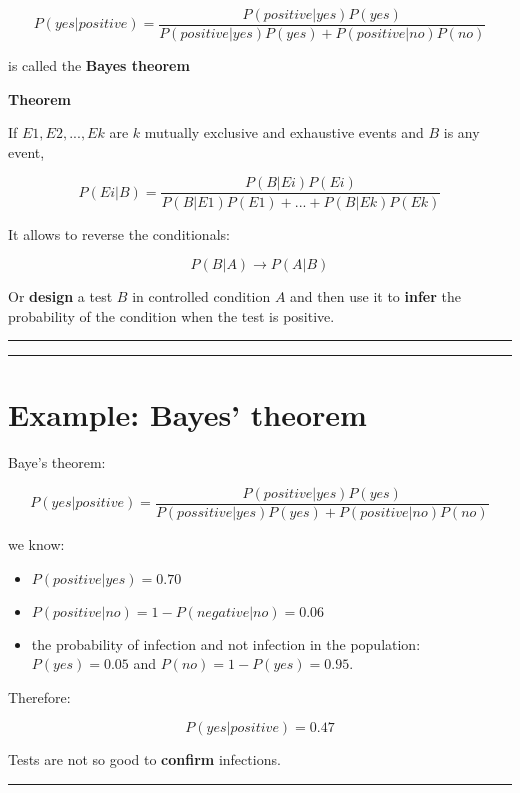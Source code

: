 \documentclass[
]{book}
\begin{document}
\[P(yes|positive)=\frac{P(positive|yes)P(yes)}{P(positive|yes)P(yes)+P(positive|no)P(no)}\]

is called the \textbf{Bayes theorem}

\textbf{Theorem}

If \(E1, E2, ..., Ek\) are \(k\) mutually exclusive and exhaustive events and \(B\) is any event,

\[P(Ei|B)=\frac{P(B|Ei)P(Ei)}{P(B|E1)P(E1) +...+ P(B|Ek)P(Ek)}\]

It allows to reverse the conditionals:

\[P(B|A) \rightarrow P(A|B)\]

Or \textbf{design} a test \(B\) in controlled condition \(A\) and then use it to \textbf{infer} the probability of the condition when the test is positive.

\begin{center}\rule{0.5\linewidth}{0.5pt}\end{center}

\begin{center}\rule{0.5\linewidth}{0.5pt}\end{center}

\hypertarget{example-bayes-theorem}{%
\section{Example: Bayes' theorem}\label{example-bayes-theorem}}

Baye's theorem:

\[P(yes|positive)  = \frac{P(positive|yes) P(yes)}{P(possitive|yes)P(yes)+P(positive|no)P(no)}\]

we know:

\begin{itemize}
\item
  \(P(positive|yes)=0.70\)
\item
  \(P(positive|no)=1- P(negative|no)=0.06\)
\item
  the probability of infection and not infection in the population: \(P(yes)=0.05\) and \(P(no)=1-P(yes)=0.95\).
\end{itemize}

Therefore:

\[P(yes|positive)=0.47\]

Tests are not so good to \textbf{confirm} infections.

\begin{center}\rule{0.5\linewidth}{0.5pt}\end{center}
\end{document}
